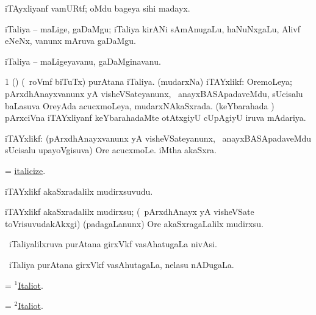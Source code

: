 \bentry
{}
\gl{\nA}
\bmng
iTAyxliyanf vamURtf; oMdu bageya sihi madayx. 
\emng
\eentry

\bentry
{}
\gl{\nA}
\bmng
iTaliya -- maLige, gaDaMgu; iTaliya kirANi sAmAnugaLu, haNuNxgaLu, Alivf eNeNx, \mo vanunx mAruva gaDaMgu. 
\emng
\eentry

\bentry
{}
\gl{\nA}
\bmng
iTaliya -- maLigeyavanu, gaDaMginavanu. 
\emng
\eentry

\bentry
{}
\gl{\gu}
\bmng
\bnum
\num{1} () (\kanmu\ roVmf biTuTx) purAtana iTaliya. 
 (mudarxNa) iTAYxlikf: 
\banum
{} OremoLeya; pArxdhAnayxvanunx yA visheVSateyanunx, \kanmu\ anayxBASApadaveMdu, sUcisalu baLasuva OreyAda acucxmoLeya, mudarxNAkaSxrada. 
 (keYbarahada \vi) pArxciVna iTAYxliyanf keYbarahadaMte otAtxgiyU cUpAgiyU iruva mAdariya. 
\eanum
\numie
\enum
\emng
\eentry

\bentry
{}
\gl{\nA}
\bmng
iTAYxlikf: 
\banum
{} (pArxdhAnayxvanunx yA visheVSateyanunx, \udA\ anayxBASApadaveMdu sUcisalu upayoVgisuva) Ore acucxmoLe. 
 iMtha akaSxra. 
\eanum
\emng
\eentry

\bentry
{}
\gl{\sakirx}
\bmng
=  \hyperlink{italicize}{italicize}. 
\emng
\eentry

\bentry
{}
\gl{\nA}
\bmng
iTAYxlikf akaSxradalilx mudirxsuvudu. 
\emng
\eentry

\bentry
{}
\gl{\sakirx}
\bmng
iTAYxlikf akaSxradalilx mudirxsu; (\sA\ pArxdhAnayx yA visheVSate toVrisuvudakAkxgi) (padagaLanunx) Ore akaSxragaLalilx mudirxsu. 
\emng
\eentry

\bentry
{}
\gl{\nA}
\bmng
\da\ iTaliyalilxruva purAtana girxVkf vasAhatugaLa nivAsi. 
\emng
\eentry

\bentry
{}
\gl{\gu}
\bmng
\da\ iTaliya purAtana girxVkf vasAhutagaLa, nelasu nADugaLa. 
\emng
\eentry

\bentry
{}
\gl{\nA}
\bmng
= \hyperlink{Italiot(1)}{$^1$Italiot}. 
\emng
\eentry

\bentry
{}
\gl{\gu}
\bmng
= \hyperlink{Italiot(2)}{$^2$Italiot}. 
\emng
\eentry

